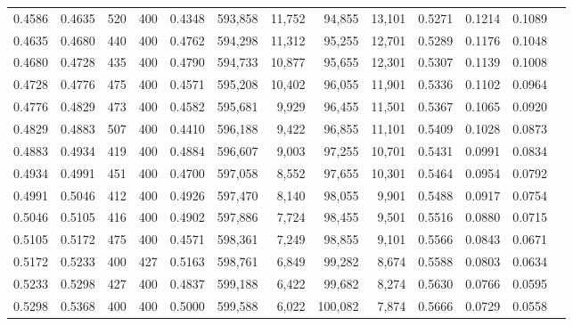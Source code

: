 \begin{tabular}{rrrrrrrrrrrrr}
0.4586 & 0.4635 &    520 & 400 &                                     0.4348 & 593,858 &  11,752 &  94,855 &  13,101 & 0.5271 & 0.1214 & 0.1089 \\
0.4635 & 0.4680 &    440 & 400 &                                     0.4762 & 594,298 &  11,312 &  95,255 &  12,701 & 0.5289 & 0.1176 & 0.1048 \\
0.4680 & 0.4728 &    435 & 400 &                                     0.4790 & 594,733 &  10,877 &  95,655 &  12,301 & 0.5307 & 0.1139 & 0.1008 \\
0.4728 & 0.4776 &    475 & 400 &                                     0.4571 & 595,208 &  10,402 &  96,055 &  11,901 & 0.5336 & 0.1102 & 0.0964 \\
0.4776 & 0.4829 &    473 & 400 &                                     0.4582 & 595,681 &   9,929 &  96,455 &  11,501 & 0.5367 & 0.1065 & 0.0920 \\
0.4829 & 0.4883 &    507 & 400 &                                     0.4410 & 596,188 &   9,422 &  96,855 &  11,101 & 0.5409 & 0.1028 & 0.0873 \\
0.4883 & 0.4934 &    419 & 400 &                                     0.4884 & 596,607 &   9,003 &  97,255 &  10,701 & 0.5431 & 0.0991 & 0.0834 \\
0.4934 & 0.4991 &    451 & 400 &                                     0.4700 & 597,058 &   8,552 &  97,655 &  10,301 & 0.5464 & 0.0954 & 0.0792 \\
0.4991 & 0.5046 &    412 & 400 &                                     0.4926 & 597,470 &   8,140 &  98,055 &   9,901 & 0.5488 & 0.0917 & 0.0754 \\
0.5046 & 0.5105 &    416 & 400 &                                     0.4902 & 597,886 &   7,724 &  98,455 &   9,501 & 0.5516 & 0.0880 & 0.0715 \\
0.5105 & 0.5172 &    475 & 400 &                                     0.4571 & 598,361 &   7,249 &  98,855 &   9,101 & 0.5566 & 0.0843 & 0.0671 \\
0.5172 & 0.5233 &    400 & 427 &                                     0.5163 & 598,761 &   6,849 &  99,282 &   8,674 & 0.5588 & 0.0803 & 0.0634 \\
0.5233 & 0.5298 &    427 & 400 &                                     0.4837 & 599,188 &   6,422 &  99,682 &   8,274 & 0.5630 & 0.0766 & 0.0595 \\
0.5298 & 0.5368 &    400 & 400 &                                     0.5000 & 599,588 &   6,022 & 100,082 &   7,874 & 0.5666 & 0.0729 & 0.0558 \\

\end{tabular}
